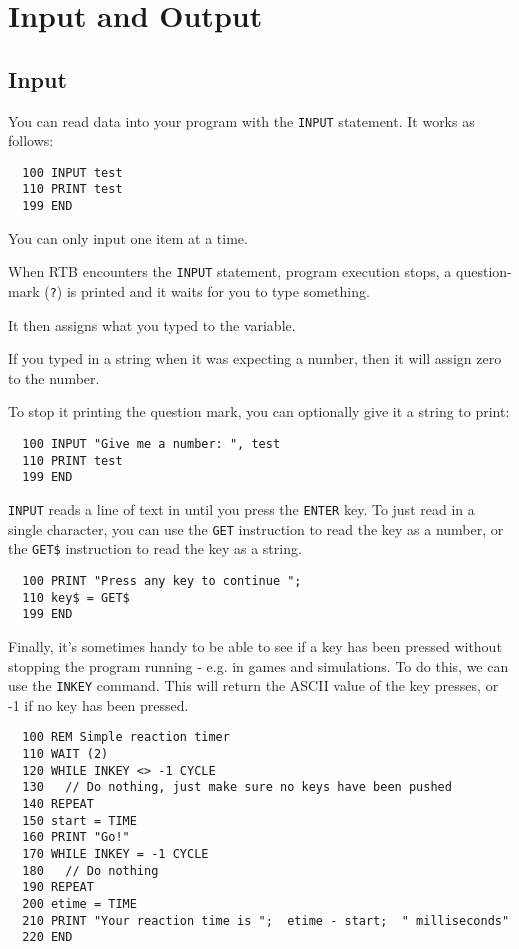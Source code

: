 \chapter{Input and Output}

\section{Input}
You can read data into your program with the {\tt INPUT} statement.
It works as follows:

\begin{verbatim}
  100 INPUT test
  110 PRINT test
  199 END
\end{verbatim}
You can only input one item at a time.

When RTB encounters the {\tt INPUT} statement, program execution
stops, a question-mark ({\tt ?}) is printed and it waits for you
to type something. 

It then assigns what you typed to the variable.

If you typed in a string when it was expecting a number, then it
will assign zero to the number.

To stop it printing the question mark, you can optionally give it
a string to print:
\begin{verbatim}
  100 INPUT "Give me a number: ", test
  110 PRINT test
  199 END
\end{verbatim}

{\tt INPUT} reads a line of text in until you press the {\tt ENTER}
key. To just read in a single character, you can use the {\tt GET}
instruction to read the key as a number, or the {\tt GET\$} instruction
to read the key as a string.
\begin{verbatim}
  100 PRINT "Press any key to continue ";
  110 key$ = GET$
  199 END
\end{verbatim}

Finally, it's sometimes handy to be able to see if a key has been pressed
without stopping the program running - e.g. in games and simulations. To
do this, we can use the {\tt INKEY} command. This will return the ASCII
value of the key presses, or -1 if no key has been pressed.
\begin{verbatim}
  100 REM Simple reaction timer
  110 WAIT (2)
  120 WHILE INKEY <> -1 CYCLE 
  130   // Do nothing, just make sure no keys have been pushed
  140 REPEAT 
  150 start = TIME
  160 PRINT "Go!"
  170 WHILE INKEY = -1 CYCLE 
  180   // Do nothing
  190 REPEAT 
  200 etime = TIME
  210 PRINT "Your reaction time is ";  etime - start;  " milliseconds"
  220 END 
\end{verbatim}


